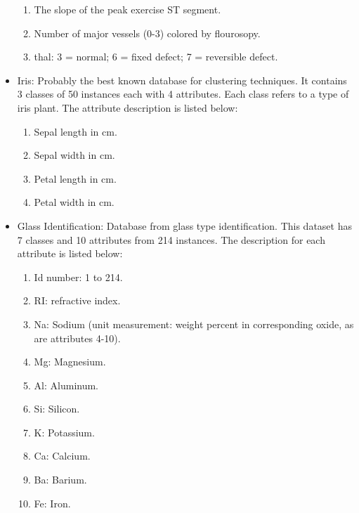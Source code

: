 \documentclass[journal]{IEEEtran}
\begin{document}
\begin{itemize}
\begin{enumerate}
		\item The slope of the peak exercise ST segment. 
		\item Number of major vessels (0-3) colored by flourosopy.
		\item thal: 3 = normal; 6 = fixed defect; 7 = reversible defect. 
	\end{enumerate}
	\item Iris: Probably the best known database for clustering techniques. It contains 3 classes of 50 instances each with 4 attributes. Each class refers to a type of iris plant. The attribute description is listed below:
	\begin{enumerate}
		\item Sepal length in cm.
		\item Sepal width in cm.
		\item Petal length in cm.
		\item Petal width in cm.
	\end{enumerate}
	
	\item Glass Identification: Database from glass type identification. This dataset has 7 classes and 10 attributes from 214 instances. The description for each attribute is listed below:
	\begin{enumerate}
		\item Id number: 1 to 214.
		\item RI: refractive index.
		\item Na: Sodium (unit measurement: weight percent in corresponding oxide, as are attributes 4-10).
		\item Mg: Magnesium.
		\item Al: Aluminum.
		\item Si: Silicon.
		\item K: Potassium.
		\item Ca: Calcium.
		\item Ba: Barium.
		\item Fe: Iron.
	\end{enumerate}
\end{itemize}
\end{document}
